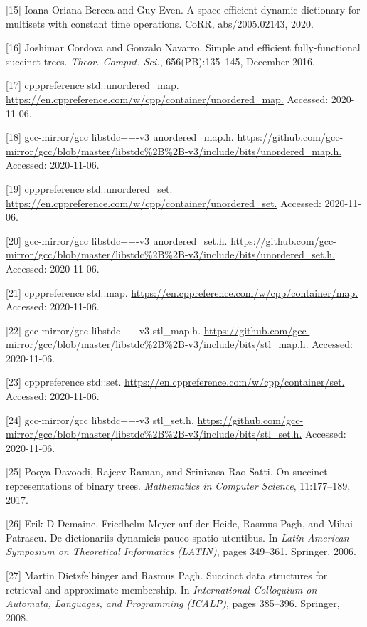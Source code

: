 \documentclass[12pt,a4paper]{ctexart}
\theoremstyle{remark}
\begin{document}
[15] Ioana Oriana Bercea and Guy Even. A space-efficient dynamic dictionary for multisets with constant time operations. CoRR, abs/2005.02143, 2020.

[16] Joshimar Cordova and Gonzalo Navarro. Simple and efficient fully-functional succinct trees. \textit{Theor. Comput. Sci.}, 656(PB):135--145, December 2016.

[17] cpppreference std::unordered\_map. \url{https://en.cppreference.com/w/cpp/container/unordered_map.} Accessed: 2020-11-06.

[18] gcc-mirror/gcc libstdc++-v3 unordered\_map.h. \url{https://github.com/gcc-mirror/gcc/blob/master/libstdc%2B%2B-v3/include/bits/unordered_map.h.} Accessed: 2020-11-06.

[19] cpppreference std::unordered\_set. \url{https://en.cppreference.com/w/cpp/container/unordered_set.} Accessed: 2020-11-06.

[20] gcc-mirror/gcc libstdc++-v3 unordered\_set.h. \url{https://github.com/gcc-mirror/gcc/blob/master/libstdc%2B%2B-v3/include/bits/unordered_set.h.} Accessed: 2020-11-06.

[21] cpppreference std::map. \url{https://en.cppreference.com/w/cpp/container/map.} Accessed: 2020-11-06.

[22] gcc-mirror/gcc libstdc++-v3 stl\_map.h. \url{https://github.com/gcc-mirror/gcc/blob/master/libstdc%2B%2B-v3/include/bits/stl_map.h.} Accessed: 2020-11-06.

[23] cpppreference std::set. \url{https://en.cppreference.com/w/cpp/container/set.} Accessed: 2020-11-06.

[24] gcc-mirror/gcc libstdc++-v3 stl\_set.h. \url{https://github.com/gcc-mirror/gcc/blob/master/libstdc%2B%2B-v3/include/bits/stl_set.h.} Accessed: 2020-11-06.

[25] Pooya Davoodi, Rajeev Raman, and Srinivasa Rao Satti. On succinct representations of binary trees. \textit{Mathematics in Computer Science}, 11:177--189, 2017.

[26] Erik D Demaine, Friedhelm Meyer auf der Heide, Rasmus Pagh, and Mihai Patrascu. De dictionariis dynamicis pauco spatio utentibus. In \textit{Latin American Symposium on Theoretical Informatics (LATIN)}, pages 349--361. Springer, 2006.

[27] Martin Dietzfelbinger and Rasmus Pagh. Succinct data structures for retrieval and approximate membership. In \textit{International Colloquium on Automata, Languages, and Programming (ICALP)}, pages 385--396. Springer, 2008.
\end{document}
